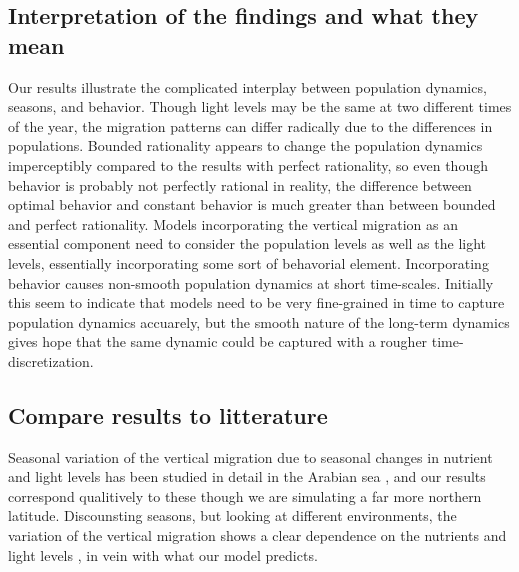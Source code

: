 \subsection*{Interpretation of the findings and what they mean} %
Our results illustrate the complicated interplay between population dynamics, seasons, and behavior. Though light levels may be the same at two different times of the year, the migration patterns can differ radically due to the differences in populations. Bounded rationality appears to change the population dynamics imperceptibly compared to the results with perfect rationality, so even though behavior is probably not perfectly rational in reality, the difference between optimal behavior and constant behavior is much greater than between bounded and perfect rationality. Models incorporating the vertical migration as an essential component need to consider the population levels as well as the light levels, essentially incorporating some sort of behavorial element. Incorporating behavior causes non-smooth population dynamics at short time-scales. Initially this seem to indicate that models need to be very fine-grained in time to capture population dynamics accuarely, but the smooth nature of the long-term dynamics gives hope that the same dynamic could be captured with a rougher time-discretization.


\subsection{Compare results to litterature} %
Seasonal variation of the vertical migration due to seasonal changes in nutrient and light levels has been studied in detail in the Arabian sea \citep{wang2014seasonal}, and our results correspond qualitively to these though we are simulating a far more northern latitude. Discounsting seasons, but looking at different environments, the variation of the vertical migration shows a clear dependence on the nutrients and light levels \citep{klevjer2016large}, in vein with what our model predicts.

